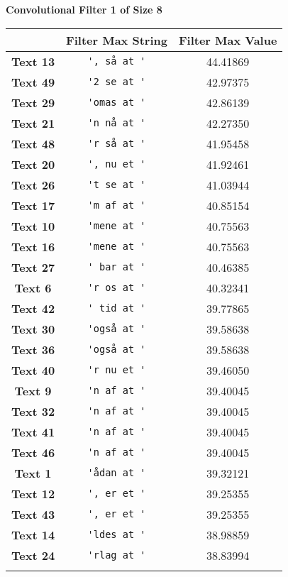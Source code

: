 \textbf{Convolutional Filter 1 of Size 8}\par\medskip
\begin{tabular}{c|cc}
    & \textbf{Filter Max String} & \textbf{Filter Max Value} \\ \hline
    \textbf{Text 13}  & \verb{', så at '{  & 44.41869 \\
    \textbf{Text 49}  & \verb{'2 se at '{  & 42.97375 \\
    \textbf{Text 29}  & \verb{'omas at '{  & 42.86139 \\
    \textbf{Text 21}  & \verb{'n nå at '{  & 42.27350 \\
    \textbf{Text 48}  & \verb{'r så at '{  & 41.95458 \\
    \textbf{Text 20}  & \verb{', nu et '{  & 41.92461 \\
    \textbf{Text 26}  & \verb{'t se at '{  & 41.03944 \\
    \textbf{Text 17}  & \verb{'m af at '{  & 40.85154 \\
    \textbf{Text 10}  & \verb{'mene at '{  & 40.75563 \\
    \textbf{Text 16}  & \verb{'mene at '{  & 40.75563 \\
    \textbf{Text 27}  & \verb{' bar at '{  & 40.46385 \\
    \textbf{Text 6}   & \verb{'r os at '{  & 40.32341 \\
    \textbf{Text 42}  & \verb{' tid at '{  & 39.77865 \\
    \textbf{Text 30}  & \verb{'også at '{  & 39.58638 \\
    \textbf{Text 36}  & \verb{'også at '{  & 39.58638 \\
    \textbf{Text 40}  & \verb{'r nu et '{  & 39.46050 \\
    \textbf{Text 9}   & \verb{'n af at '{  & 39.40045 \\
    \textbf{Text 32}  & \verb{'n af at '{  & 39.40045 \\
    \textbf{Text 41}  & \verb{'n af at '{  & 39.40045 \\
    \textbf{Text 46}  & \verb{'n af at '{  & 39.40045 \\
    \textbf{Text 1}   & \verb{'ådan at '{  & 39.32121 \\
    \textbf{Text 12}  & \verb{', er et '{  & 39.25355 \\
    \textbf{Text 43}  & \verb{', er et '{  & 39.25355 \\
    \textbf{Text 14}  & \verb{'ldes at '{  & 38.98859 \\
    \textbf{Text 24}  & \verb{'rlag at '{  & 38.83994 \\
}}}}}}}}}}}}}}}}}}}}}}}}}
\end{tabular}
